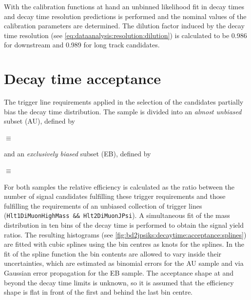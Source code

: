 With the calibration functions at hand an unbinned likelihood fit in decay
times and decay time resolution predictions is performed and the nominal
values of the calibration parameters are determined. The dilution factor
induced by the decay time resolution (see
\cref{eq:dataanalysis:resolution:dilution}) is calculated to be \num{0.986}
for downstream and \num{0.989} for long track candidates.

\section{Decay time acceptance}
\label{sec:bd2jpsiks:decaytime:acceptance}

The trigger line requirements applied in the selection of the \BdToJPsiKS
candidates partially bias the decay time distribution. The sample is divided
into an \emph{almost unbiased} subset (AU), defined by
\begin{description}\small
  \item[AU] $\equiv$ 
\end{description}
and an \emph{exclusively biased} subset (EB), defined by
\begin{description}\small
  \item[EB] $\equiv$ 
\end{description}

For both samples the relative efficiency is calculated as the ratio between
the number of signal candidates fulfilling these trigger requirements and
those fulfilling the requirements of an unbiased collection of trigger lines
(\texttt{Hlt1DiMuonHighMass \&\& Hlt2DiMuonJPsi}). A simultaneous fit of the
mass distribution in ten bins of the decay time is performed to obtain the
signal yield ratios. The resulting histograms (see
\cref{fig:bd2jpsiks:decaytime:acceptance:splines}) are fitted with cubic
splines using the bin centres as knots for the splines. In the fit of the
spline function the bin contents are allowed to vary inside their
uncertainties, which are estimated as binomial errors for the AU sample and
via Gaussian error propagation for the EB sample. The acceptance shape at and
beyond the decay time limits is unknown, so it is assumed that the efficiency
shape is flat in front of the first and behind the last bin centre.

